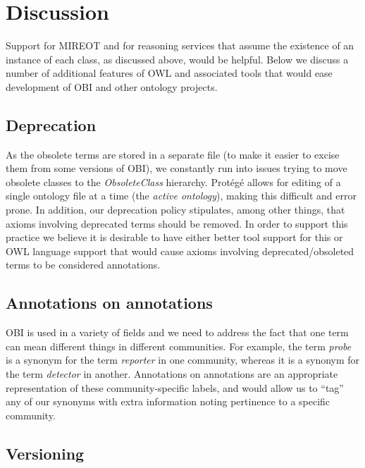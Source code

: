 \documentclass{elsart}       %
\begin{document}
\section{Discussion}

Support for MIREOT and for reasoning services that assume the existence of an instance of each class, as discussed above, would be helpful.
Below we discuss a number of additional features of OWL and associated tools that would ease development of OBI and other ontology projects.

\subsection{Deprecation}
As the obsolete terms are stored in a separate file (to make it easier to excise them from some versions of OBI), we constantly run into issues trying to move obsolete classes to the \emph{ObsoleteClass} hierarchy.
Prot\'eg\'e allows for editing of a single ontology file at a time (the \emph{active ontology}), making this difficult and error prone.
In addition, our deprecation policy stipulates, among other things, that axioms involving deprecated terms should be removed.
In order to support this practice we believe it is desirable to have either better tool support for this or OWL language support that would cause axioms involving deprecated/obsoleted terms to be considered annotations.

\subsection{Annotations on annotations}

OBI is used in a variety of fields and we need to address the fact that one term can mean different things in different communities. 
For example, the term \emph{probe} is a synonym for the term \emph{reporter} in one community, whereas it is a synonym for the term \emph{detector} in another.
Annotations on annotations are an appropriate representation of these community-specific labels, and would allow us to “tag” any of our synonyms with extra information noting pertinence to a specific community.

\subsection{Versioning}
\end{document}

